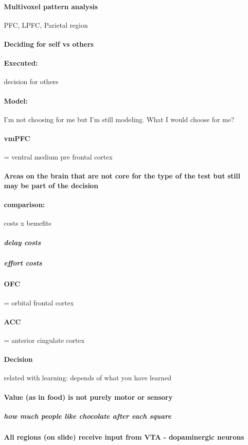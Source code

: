 \documentclass[12pt,article,oneside,a4paper]{memoir}
\begin{document}
\paragraph{Multivoxel pattern analysis} PFC, LPFC, Parietal region
\paragraph{Deciding for self vs others}
\paragraph{Executed:} decision for others
\paragraph{Model:} I'm not choosing for me but I'm still modeling. What I would choose for me?
\paragraph{vmPFC} = ventral medium pre frontal cortex
\paragraph{Areas on the brain that are not core for the type of the test but still may be part of the decision}
\paragraph{comparison:} costs x bemefits
\subparagraph{delay costs}
\subparagraph{effort costs}
\paragraph{OFC} = orbital frontal cortex
\paragraph{ACC} = anterior cingulate cortex

\paragraph{Decision} related with learning: depends of what you have learned
\paragraph{Value (as in food) is not purely motor or sensory}
\subparagraph{how much people like chocolate after each square}
\paragraph{All regions (on slide) receive input from VTA - dopaminergic neurons}
\end{document}
